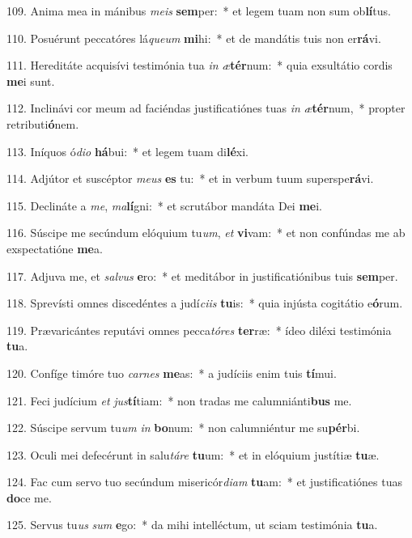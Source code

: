 109. Anima mea in mánibus \textit{me}\textit{is} \textbf{sem}per:~*  et legem tuam non sum ob\textbf{lí}tus.\

110. Posuérunt peccatóres lá\textit{que}\textit{um} \textbf{mi}hi:~*  et de mandátis tuis non er\textbf{rá}vi.\

111. Hereditáte acquisívi testimónia tua \textit{in} \textit{æ}\textbf{tér}num:~*  quia exsultátio cordis \textbf{me}i sunt.\

112. Inclinávi cor meum ad faciéndas justificatiónes tuas \textit{in} \textit{æ}\textbf{tér}num,~*  propter retributi\textbf{ó}nem.\

113. Iníquos ó\textit{di}\textit{o} \textbf{há}bui:~*  et legem tuam di\textbf{lé}xi.\

114. Adjútor et suscéptor \textit{me}\textit{us} \textbf{es} tu:~*  et in verbum tuum superspe\textbf{rá}vi.\

115. Declináte a \textit{me}, \textit{ma}\textbf{lí}gni:~*  et scrutábor mandáta Dei \textbf{me}i.\

116. Súscipe me secúndum elóquium tu\textit{um}, \textit{et} \textbf{vi}vam:~*  et non confúndas me ab exspectatióne \textbf{me}a.\

117. Adjuva me, et \textit{sal}\textit{vus} \textbf{e}ro:~*  et meditábor in justificatiónibus tuis \textbf{sem}per.\

118. Sprevísti omnes discedéntes a judí\textit{ci}\textit{is} \textbf{tu}is:~*  quia injústa cogitátio e\textbf{ó}rum.\

119. Prævaricántes reputávi omnes pecca\textit{tó}\textit{res} \textbf{ter}ræ:~*  ídeo diléxi testimónia \textbf{tu}a.\

120. Confíge timóre tuo \textit{car}\textit{nes} \textbf{me}as:~*  a judíciis enim tuis \textbf{tí}mui.\

121. Feci judícium \textit{et} \textit{jus}\textbf{tí}tiam:~*  non tradas me calumniánti\textbf{bus} me.\

122. Súscipe servum tu\textit{um} \textit{in} \textbf{bo}num:~*  non calumniéntur me su\textbf{pér}bi.\

123. Oculi mei defecérunt in salu\textit{tá}\textit{re} \textbf{tu}um:~*  et in elóquium justítiæ \textbf{tu}æ.\

124. Fac cum servo tuo secúndum misericór\textit{di}\textit{am} \textbf{tu}am:~*  et justificatiónes tuas \textbf{do}ce me.\

125. Servus tu\textit{us} \textit{sum} \textbf{e}go:~*  da mihi intelléctum, ut sciam testimónia \textbf{tu}a.\

